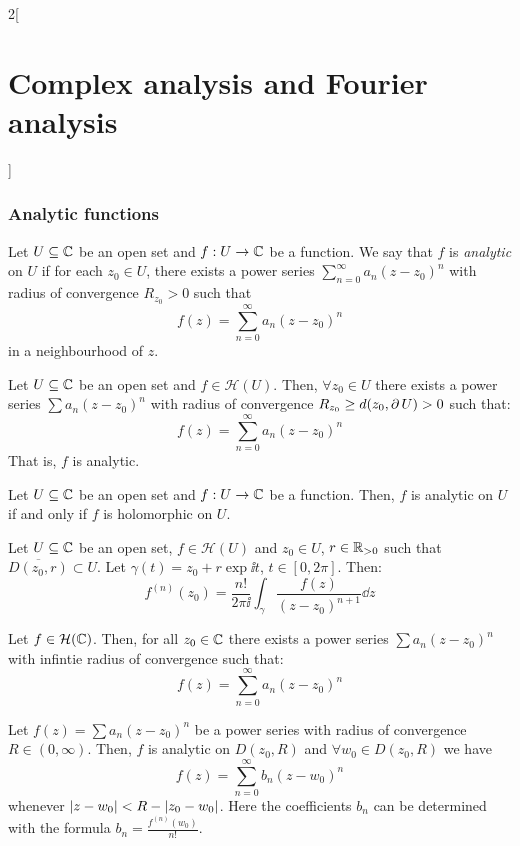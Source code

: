 \documentclass[../../../main.tex]{subfiles}
\begin{document}
\begin{multicols}{2}[\section{Complex analysis and Fourier analysis}]
  \subsubsection{Analytic functions}
  \begin{definition}
    Let $U\subseteq\mathbb{C}$ be an open set and $f:U\rightarrow \mathbb{C}$ be a function. We say that $f$ is \emph{analytic} on $U$ if for each $z_0\in U$, there exists a power series $\sum_{n=0}^\infty a_n{(z-z_0)}^n$ with radius of convergence $R_{z_0}>0$ such that $$f(z)=\sum_{n=0}^\infty a_n{(z-z_0)}^n$$ in a neighbourhood of $z$.
  \end{definition}
  \begin{theorem}
    Let $U\subseteq\mathbb{C}$ be an open set and $f\in\mathcal{H}(U)$. Then, $\forall z_0\in U$ there exists a power series $\sum a_n{(z-z_0)}^n$ with radius of convergence $R_{z_0}\geq d(z_0,\operatorname{\partial} U)>0$ such that: $$f(z)=\sum_{n=0}^\infty a_n{(z-z_0)}^n$$ That is, $f$ is analytic.
  \end{theorem}
  \begin{corollary}
    Let $U\subseteq\mathbb{C}$ be an open set and $f:U\rightarrow \mathbb{C}$ be a function. Then, $f$ is analytic on $U$ if and only if $f$ is holomorphic on $U$.
  \end{corollary}
  \begin{corollary}
    Let $U\subseteq\mathbb{C}$ be an open set, $f\in\mathcal{H}(U)$ and $z_0\in U$, $r\in\mathbb{R}_{>0}$ such that $\overline{D(z_0,r)}\subset U$. Let $\gamma(t)=z_0+r\exp{\ii t}$, $t\in[0,2\pi]$. Then:
    $$f^{(n)}(z_0)=\frac{n!}{2\pi\ii}\int_\gamma\frac{f(z)}{{(z-z_0)}^{n+1}}\dd{z}$$
  \end{corollary}
  \begin{corollary}
    Let $f\in\mathcal{H}(\mathbb{C})$. Then, for all $z_0\in\mathbb{C}$ there exists a power series $\sum a_n{(z-z_0)}^n$ with infintie radius of convergence such that: $$f(z)=\sum_{n=0}^\infty a_n{(z-z_0)}^n$$
  \end{corollary}
  \begin{corollary}
    Let $f(z)=\sum a_n{(z-z_0)}^n$ be a power series with radius of convergence $R\in(0,\infty)$. Then, $f$ is analytic on $D(z_0,R)$ and $\forall w_0\in D(z_0,R)$ we have $$f(z)=\sum_{n=0}^\infty b_n{(z-w_0)}^n$$ whenever $\abs{z-w_0}<R-|z_0-w_0|$. Here the coefficients $b_n$ can be determined with the formula $b_n=\frac{f^{(n)}(w_0)}{n!}$.
  \end{corollary}

\end{multicols}
\end{document}
